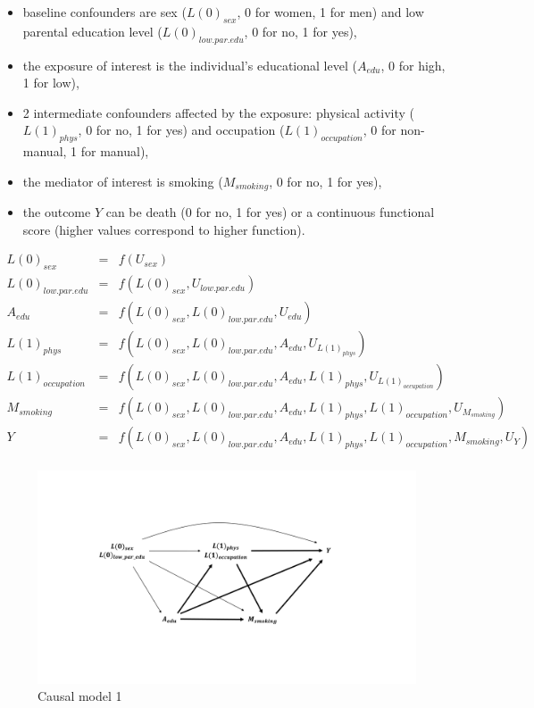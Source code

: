 \documentclass[
]{book}
\providecommand{\tightlist}{%
  \setlength{\itemsep}{0pt}\setlength{\parskip}{0pt}}
\begin{document}
\begin{itemize}
\tightlist
\item
  baseline confounders are sex (\(L(0)_{sex}\), 0 for women, 1 for men) and low parental education level (\(L(0)_{low.par.edu}\), 0 for no, 1 for yes),
\item
  the exposure of interest is the individual's educational level (\(A_{edu}\), 0 for high, 1 for low),
\item
  2 intermediate confounders affected by the exposure: physical activity (\(L(1)_{phys}\), 0 for no, 1 for yes) and occupation (\(L(1)_{occupation}\), 0 for non-manual, 1 for manual),
\item
  the mediator of interest is smoking (\(M_{smoking}\), 0 for no, 1 for yes),
\item
  the outcome \(Y\) can be death (0 for no, 1 for yes) or a continuous functional score (higher values correspond to higher function).
\end{itemize}

\[
\begin{array}{lll}
  L(0)_{sex}         &=& f\left(U_{sex}\right) \\
  L(0)_{low.par.edu} &=& f\left(L(0)_{sex}, U_{low.par.edu}\right) \\
  A_{edu}            &=& f\left(L(0)_{sex}, L(0)_{low.par.edu}, U_{edu}\right) \\
  L(1)_{phys}        &=& f\left(L(0)_{sex}, L(0)_{low.par.edu}, A_{edu}, U_{L(1)_{phys}}\right) \\
  L(1)_{occupation}  &=& f\left(L(0)_{sex}, L(0)_{low.par.edu}, A_{edu}, L(1)_{phys}, U_{L(1)_{occupation}}\right) \\
  M_{smoking}        &=& f\left(L(0)_{sex}, L(0)_{low.par.edu}, A_{edu}, L(1)_{phys}, L(1)_{occupation}, U_{M_{smoking}}\right) \\
  Y                  &=& f\left(L(0)_{sex}, L(0)_{low.par.edu}, A_{edu}, L(1)_{phys}, L(1)_{occupation}, M_{smoking}, U_Y \right) \\
\end{array}\]

\begin{figure}

{\centering \includegraphics[width=1\linewidth]{./images/DAG_M1} 

}

\caption{Causal model 1}\label{fig:figDAGM1}
\end{figure}
\end{document}
